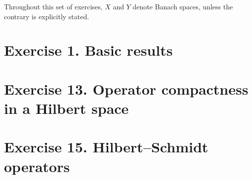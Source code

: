 %
Throughout this set of exercises, $X$ and $Y$ denote Banach spaces, unless the contrary is explicitly stated.
\section{Exercise 1. Basic results}
 
% 
\setcounter{section}{12}
% 
\section{Exercise 13. Operator compactness in a Hilbert space}
 
%
\setcounter{section}{14}
% 
\section{Exercise 15. Hilbert--Schmidt operators}

% 
